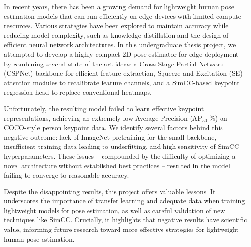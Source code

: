 In recent years, there has been a growing demand for lightweight human pose estimation models that can run efficiently on edge devices with limited compute resources. Various strategies have been explored to maintain accuracy while reducing model complexity, such as knowledge distillation and the design of efficient neural network architectures. In this undergraduate thesis project, we attempted to develop a highly compact 2D pose estimator for edge deployment by combining several state-of-the-art ideas: a Cross Stage Partial Network (CSPNet) backbone for efficient feature extraction, Squeeze-and-Excitation (SE) attention modules to recalibrate feature channels, and a SimCC-based keypoint regression head to replace conventional heatmaps.

Unfortunately, the resulting model failed to learn effective keypoint representations, achieving an extremely low Average Precision (AP$_{50}$ \%) on COCO-style person keypoint data. We identify several factors behind this negative outcome: lack of ImageNet pretraining for the small backbone, insufficient training data leading to underfitting, and high sensitivity of SimCC hyperparameters. These issues – compounded by the difficulty of optimizing a novel architecture without established best practices – resulted in the model failing to converge to reasonable accuracy.

Despite the disappointing results, this project offers valuable lessons. It underscores the importance of transfer learning and adequate data when training lightweight models for pose estimation, as well as careful validation of new techniques like SimCC. Crucially, it highlights that negative results have scientific value, informing future research toward more effective strategies for lightweight human pose estimation.
